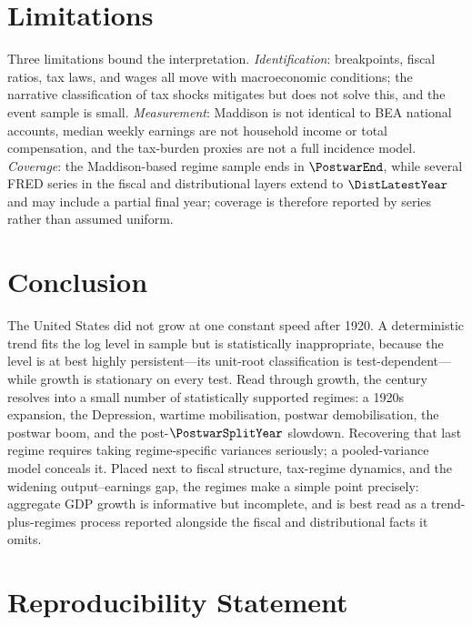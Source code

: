 \documentclass[11pt]{article}
\begin{document}
\section{Limitations}
\label{sec:limitations}

Three limitations bound the interpretation. \emph{Identification}: breakpoints,
fiscal ratios, tax laws, and wages all move with macroeconomic conditions; the
narrative classification of tax shocks mitigates but does not solve this, and the
event sample is small. \emph{Measurement}: Maddison is not identical to BEA
national accounts, median weekly earnings are not household income or total
compensation, and the tax-burden proxies are not a full incidence model.
\emph{Coverage}: the Maddison-based regime sample ends in $\PostwarEnd$, while
several FRED series in the fiscal and distributional layers extend to
$\DistLatestYear$ and may include a partial final year; coverage is therefore
reported by series rather than assumed uniform.

\section{Conclusion}
\label{sec:conclusion}

The United States did not grow at one constant speed after 1920. A deterministic
trend fits the log level in sample but is statistically inappropriate, because the
level is at best highly persistent---its unit-root classification is
test-dependent---while growth is stationary on every test.
Read through growth, the century resolves into a small number of statistically
supported regimes: a 1920s expansion, the Depression, wartime mobilisation,
postwar demobilisation, the postwar boom, and the post-$\PostwarSplitYear$
slowdown. Recovering that last regime requires taking regime-specific variances
seriously; a pooled-variance model conceals it. Placed next to fiscal structure,
tax-regime dynamics, and the widening output--earnings gap, the regimes make a
simple point precisely: aggregate GDP growth is informative but incomplete, and
is best read as a trend-plus-regimes process reported alongside the fiscal and
distributional facts it omits.

\section*{Reproducibility Statement}
\end{document}
